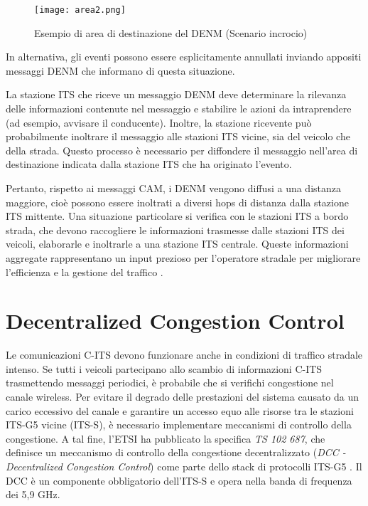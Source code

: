 \begin{figure}[h!]
    \centering
    \texttt{[image: area2.png]}
    \caption{Esempio di area di destinazione del DENM (Scenario incrocio)}
    \label{fig:area2}
\end{figure}

In alternativa, gli eventi possono essere esplicitamente annullati inviando appositi messaggi DENM che informano di questa situazione.

La stazione ITS che riceve un messaggio DENM deve determinare la rilevanza delle informazioni contenute nel messaggio e stabilire le azioni da intraprendere (ad esempio, avvisare il conducente). Inoltre, la stazione ricevente può probabilmente inoltrare il messaggio alle stazioni ITS vicine, sia del veicolo che della strada. Questo processo è necessario per diffondere il messaggio nell'area di destinazione indicata dalla stazione ITS che ha originato l'evento. 

Pertanto, rispetto ai messaggi CAM, i DENM vengono diffusi a una distanza maggiore, cioè possono essere inoltrati a diversi hops di distanza dalla stazione ITS mittente. Una situazione particolare si verifica con le stazioni ITS a bordo strada, che devono raccogliere le informazioni trasmesse dalle stazioni ITS dei veicoli, elaborarle e inoltrarle a una stazione ITS centrale. Queste informazioni aggregate rappresentano un input prezioso per l'operatore stradale per migliorare l'efficienza e la gestione del traffico \cite{cam_denm}.

\section[ETSI DCC]{Decentralized Congestion Control}
\label{dcc}
Le comunicazioni C-ITS devono funzionare anche in condizioni di traffico stradale intenso. Se tutti i veicoli partecipano allo scambio di informazioni C-ITS trasmettendo messaggi periodici, è probabile che si verifichi congestione nel canale wireless. Per evitare il degrado delle prestazioni del sistema causato da un carico eccessivo del canale e garantire un accesso equo alle risorse tra le stazioni ITS-G5 vicine (ITS-S), è necessario implementare meccanismi di controllo della congestione. A tal fine, l'ETSI ha pubblicato la specifica \textit{TS 102 687}, che definisce un meccanismo di controllo della congestione decentralizzato (\textit{DCC - Decentralized Congestion Control}) come parte dello stack di protocolli ITS-G5 \cite{8535090}. Il DCC è un componente obbligatorio dell'ITS-S e opera nella banda di frequenza dei 5,9 GHz.

